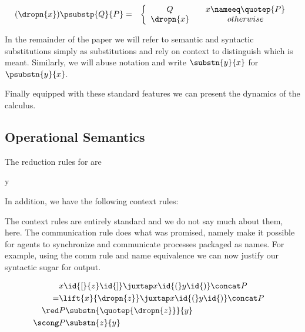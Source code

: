 \begin{eqnarray}
(\dropn{x})  \psubstp{Q}{P}       
		& = & 
		\left\{ 
			\begin{array}{ccc} 
				Q & & x \nameeq \quotep{P} \\
                              	\dropn{x} & & otherwise \\
			\end{array}
		\right. \nonumber
\end{eqnarray}

In the remainder of the paper we will refer to semantic and syntactic
substitutions simply as substitutions and rely on context to
distinguish which is meant. Similarly, we will abuse notation and
write $\substn{y}{x}$ for $\psubstn{y}{x}$.

Finally equipped with these standard features we can present the
dynamics of the calculus.

\subsection{Operational Semantics}
The reduction rules for {\rhoc}  are


{{ }
\id{\{} \id{/} {y} \id{\}}}

In addition, we have the following context rules:



The context rules are entirely standard and we do not say much about
them, here. The communication rule does what was promised, namely make
it possible for agents to synchronize and communicate processes
packaged as names. For example, using the comm rule and name
equivalence we can now justify our syntactic sugar for output.

\begin{eqnarray}
  & {x}\id{[}{z}\id{]} \juxtap x \id{(}y\id{)} \concat P & \nonumber\\
  = 
  & \lift{x}{\dropn{z}} \juxtap x \id{(}y\id{)} \concat P & \nonumber\\
  \red 
  & P \substn{\quotep{\dropn{z}}}{y} & \nonumber\\
  \scong & P \substn{z}{y} & \nonumber
\end{eqnarray}

